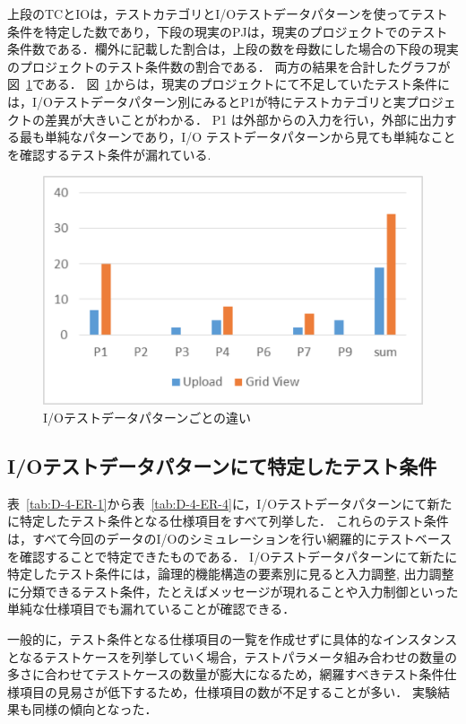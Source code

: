 上段のTCとIOは，テストカテゴリとI/Oテストデータパターンを使ってテスト条件を特定した数であり，下段の現実のPJは，現実のプロジェクトでのテスト条件数である．欄外に記載した割合は，上段の数を母数にした場合の下段の現実のプロジェクトのテスト条件数の割合である．
両方の結果を合計したグラフが図~\ref{fig:D-4-Fig11}である．
図~\ref{fig:D-4-Fig11}からは，現実のプロジェクトにて不足していたテスト条件には，I/Oテストデータパターン別にみるとP1が特にテストカテゴリと実プロジェクトの差異が大きいことがわかる．
P1 は外部からの入力を行い，外部に出力する最も単純なパターンであり，I/O テストデータパターンから見ても単純なことを確認するテスト条件が漏れている.

\begin{figure}[htbp]
\begin{center}
\includegraphics[width=12cm]{./image/D-4-Fig11.png}
\caption{I/Oテストデータパターンごとの違い}
\label{fig:D-4-Fig11}
\end{center}
\end{figure}

\subsection{I/Oテストデータパターンにて特定したテスト条件}
表~\ref{tab:D-4-ER-1}から表~\ref{tab:D-4-ER-4}に，I/Oテストデータパターンにて新たに特定したテスト条件となる仕様項目をすべて列挙した．
これらのテスト条件は，すべて今回のデータのI/Oのシミュレーションを行い網羅的にテストベースを確認することで特定できたものである．
I/Oテストデータパターンにて新たに特定したテスト条件には，論理的機能構造の要素別に見ると入力調整, 出力調整に分類できるテスト条件，たとえばメッセージが現れることや入力制御といった単純な仕様項目でも漏れていることが確認できる．

一般的に，テスト条件となる仕様項目の一覧を作成せずに具体的なインスタンスとなるテストケースを列挙していく場合，テストパラメータ組み合わせの数量の多さに合わせてテストケースの数量が膨大になるため，網羅すべきテスト条件仕様項目の見易さが低下するため，仕様項目の数が不足することが多い．
実験結果も同様の傾向となった．

